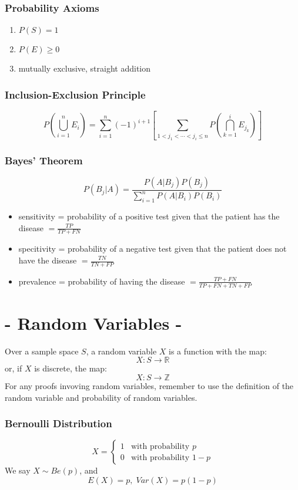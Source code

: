 \documentclass[a4paper,12pt]{article}
\begin{document}
\begin{multicols}{2}
\subsubsection*{Probability Axioms}
\begin{enumerate}
    \item $P(S) = 1$
    \item $P(E)\geq 0$
    \item mutually exclusive, straight addition
\end{enumerate}
\subsubsection*{Inclusion-Exclusion Principle}
\[
P(\bigcup_{i=1}^n E_i) = \sum_{i=1}^{n}(-1)^{i+1}[\sum_{1<j_1<\cdots<j_i\leq n}P(\bigcap_{k=1}^i E_{j_k})]
\]
\subsubsection*{Bayes' Theorem}
\[
P(B_j|A) = \frac{P(A|B_j)P(B_j)}{\sum_{i=1}^{n}P(A|B_i)P(B_i)}
\]
\begin{itemize}
    \item sensitivity = probability of a positive test given that the patient has the disease $=\frac{TP}{TP+FN}$
    \item specitivity = probability of a negative test given that the patient does not have the disease $=\frac{TN}{TN+FP}$
    \item prevalence = probability of having the disease $=\frac{TP+FN}{TP+FN+TN+FP}$
\end{itemize}

\newpage
\section*{- Random Variables -} 
Over a sample space $S$, a random variable $X$ is a function with the map: 
\[
X: S \rightarrow \mathbb{R}
\]
or, if $X$ is discrete, the map:
\[
X: S \rightarrow \mathbb{Z}
\]
For any proofs invoving random variables, remember to use the definition of the random variable and probability of random variables.

\subsubsection*{Bernoulli Distribution}
\[
X = \begin{cases}
1 & \text{with probability } p \\
0 & \text{with probability } 1-p
\end{cases}
\]
We say $X\sim Be(p)$, and $$E(X) = p, \; Var(X) = p(1-p)$$


\end{multicols}
\end{document}
